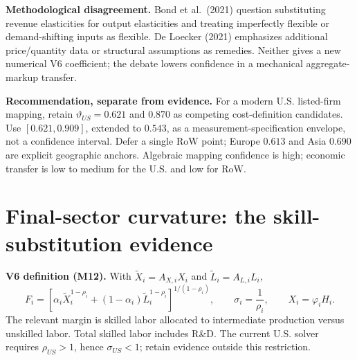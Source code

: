 \textbf{Methodological disagreement.}  Bond et al.\ (2021) question substituting revenue elasticities for output elasticities and treating imperfectly flexible or demand-shifting inputs as flexible.  De Loecker (2021) emphasizes additional price/quantity data or structural assumptions as remedies. Neither gives a new numerical V6 coefficient; the debate lowers confidence in a mechanical aggregate-markup transfer.

\textbf{Recommendation, separate from evidence.} For a modern U.S. listed-firm mapping, retain $\vartheta_{US}=0.621$ and $0.870$ as competing cost-definition candidates. Use $[0.621,0.909]$, extended to $0.543$, as a measurement-specification envelope, not a confidence interval. Defer a single RoW point; Europe $0.613$ and Asia $0.690$ are explicit geographic anchors. Algebraic mapping confidence is high; economic transfer is low to medium for the U.S. and low for RoW.

\clearpage
\section{Final-sector curvature: the skill-substitution evidence}
\textbf{V6 definition (M12).} With $\widetilde X_i=A_{X,i}X_i$ and $\widetilde L_i=A_{L,i}L_i$,
\[
F_i=\left[\alpha_i\widetilde X_i^{1-\rho_i}+(1-\alpha_i)\widetilde L_i^{1-\rho_i}\right]^{1/(1-\rho_i)},
\qquad \sigma_i=\frac1{\rho_i},\qquad X_i=\varphi_i H_i.
\]
The relevant margin is skilled labor allocated to intermediate production versus unskilled labor. Total skilled labor includes R\&D. The current U.S. solver requires $\rho_{US}>1$, hence $\sigma_{US}<1$; retain evidence outside this restriction.

